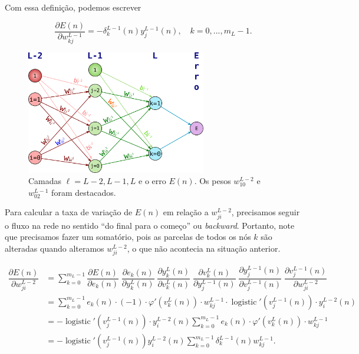 \documentclass[12pt,a4paper]{article}
\DeclareMathOperator{\logistic}{logistic}
\begin{document}
Com essa definição, podemos escrever

\begin{equation}
\dfrac{\partial E(n)}{\partial w^{L-1}_{kj}} = -\delta^{L-1}_k(n) y_j^{L-1}(n), \quad k=0,...,m_L-1.
\end{equation}


\begin{figure}[H]\centering
	\label{fig:rede}
\includegraphics[width=0.7\textwidth]{rede}
\caption{Camadas $\ell=L-2,L-1,L$ e o erro $E(n)$. Os pesos $w^{L-2}_{10}$ e $w^{L-1}_{02}$ foram destacados.}
\end{figure}


Para calcular a taxa de variação de $E(n)$ em relação a $w^{L-2}_{ji}$, precisamos seguir o fluxo na rede no sentido ``do final para o começo'' ou \textit{backward}. Portanto, note que precisamos fazer um somatório, pois as parcelas de todos os nós $k$ são alteradas quando alteramos $w^{L-2}_{ji}$, o que não acontecia na situação anterior.  

$
\begin{aligned}
\dfrac{\partial E(n)}{\partial w^{L-2}_{ji}} 
&= \displaystyle\sum_{k=0}^{m_L-1}
\dfrac{\partial E(n)}{\partial e_k(n)}
\;
\dfrac{\partial e_k(n)}{\partial y^{L}_k(n)}
\;
\dfrac{\partial y^L_k(n)}{\partial v_k^{L}(n)}
\;
\dfrac{\partial v_k^L(n)}{\partial y^{L-1}_{j}(n)}
\;
\dfrac{\partial y^{L-1}_{j}(n)}{\partial v^{L-1}_{j}(n)}
\;
\dfrac{\partial v^{L-1}_{j}(n)}{\partial w^{L-2}_{ji}}
\\
&=\displaystyle\sum_{k=0}^{m_L-1}
e_k(n) \cdot (-1) \cdot
\varphi'(v_k^{L}(n)) \cdot w_{kj}^{L-1} \cdot \logistic'(v_j^{L-1}(n)) \cdot y_i^{L-2}(n)
\\
&=\displaystyle-\logistic'(v_j^{L-1}(n)) \cdot y_i^{L-2}(n)\sum_{k=0}^{m_L-1}
e_k(n) \cdot  
\varphi'(v_k^{L}(n)) \cdot w_{kj}^{L-1} 
\\
&=\displaystyle-\logistic'(v_j^{L-1}(n))   y_i^{L-2}(n)\sum_{k=0}^{m_L-1}
\delta^{L-1}_k(n)  w_{kj}^{L-1} .
\end{aligned}
$
\end{document}
